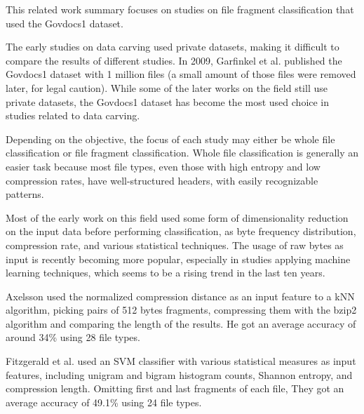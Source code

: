 This related work summary focuses on studies on file fragment classification that used the Govdocs1 dataset\cite{garfinkel_bringing_2009}.

The early studies on data carving used private datasets, making it difficult to compare the results of different studies. In 2009, Garfinkel et al. \cite{garfinkel_bringing_2009} published the Govdocs1 dataset with 1 million files (a small amount of those files were removed later, for legal caution). While some of the later works on the field still use private datasets, the Govdocs1 dataset has become the most used choice in studies related to data carving.

Depending on the objective, the focus of each study may either be whole file classification or file fragment classification. Whole file classification is generally an easier task because most file types, even those with high entropy and low compression rates, have well-structured headers, with easily recognizable patterns.

Most of the early work on this field used some form of dimensionality reduction on the input data before performing classification, as byte frequency distribution, compression rate, and various statistical techniques. The usage of raw bytes as input is recently becoming more popular, especially in studies applying machine learning techniques, which seems to be a rising trend in the last ten years.


Axelsson \cite{axelsson_normalised_2010}
used the normalized compression distance as an input feature to a kNN algorithm,
picking pairs of 512 bytes fragments, compressing them with the bzip2 algorithm
and comparing the length of the results.
He got an average accuracy of around 34\% using 28 file types.


Fitzgerald et al. \cite{fitzgerald_using_2012}  
used an SVM classifier with various statistical measures as input features, including unigram and bigram histogram counts, Shannon entropy, and compression length.
Omitting first and last fragments of each file,
They got an average accuracy of 49.1\% using 24 file types.

